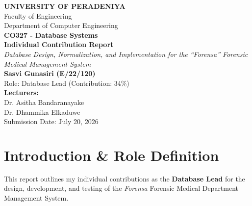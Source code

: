 \documentclass[12pt,a4paper]{article}
\begin{document}
\begin{titlepage}
    \centering
    \vspace*{1.5cm}
    \Huge
    \textbf{UNIVERSITY OF PERADENIYA}\\
    \vspace{0.5cm}
    \large
    Faculty of Engineering\\
    Department of Computer Engineering\\
    \vspace{1.5cm}
    \Large
    \textbf{CO327 - Database Systems}\\
    \vspace{1cm}
    \Huge
    \textbf{Individual Contribution Report}\\
    \vspace{0.8cm}
    \Large
    \textit{Database Design, Normalization, and Implementation for the ``Forensa'' Forensic Medical Management System}\\
    \vspace{2.5cm}
    \textbf{Sasvi Gunasiri (E/22/120)}\\
    \large
    Role: Database Lead (Contribution: 34\%)\\
    \vspace{2.5cm}
    \textbf{Lecturers:}\\
    Dr. Asitha Bandaranayake\\
    Dr. Dhammika Elkaduwe\\
    \vfill
    \large
    Submission Date: July 20, 2026
\end{titlepage}

\newpage
\tableofcontents
\newpage

\section{Introduction \& Role Definition}
This report outlines my individual contributions as the \textbf{Database Lead} for the design, development, and testing of the \textit{Forensa} Forensic Medical Department Management System. 
\end{document}
